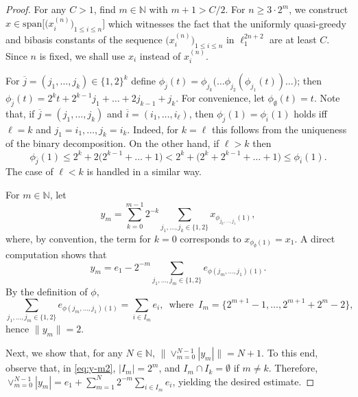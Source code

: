\documentclass[12pt,leqno]{amsart}
\numberwithin{equation}{section}
\theoremstyle{definition}
\def\N{{\mathbb N}}
\begin{document}
\begin{proof}
For any $C > 1$, find $m \in \N$ with $m+1 > C/2$.
 For $n \geq 3 \cdot 2^m$, we construct $x \in {\mathrm{span}} \big[ \big(x_i^{(n)}\big)_{1 \leq i \leq n} \big]$ which witnesses the fact that the uniformly quasi-greedy and  bibasis constants of the sequence $\big(x_i^{(n)}\big)_{1 \leq i \leq n}$ in $\ell_1^{2n+2}$ are at least $C$.
 Since $n$ is fixed, we shall use $x_i$ instead of $x_i^{(n)}$.
 \medskip

 
 For $\overline{j} = ( j_1, \ldots, j_k ) \in \{1,2\}^k$ define $\phi_{\overline{j}}(t) = \phi_{j_k} \big( \ldots \phi_{j_2}(\phi_{j_1}(t)) \ldots \big)$; then
 $\phi_{\overline{j}}(t) = 2^k t + 2^{k-1} j_1 + \ldots + 2 j_{k-1} + j_k$.
 For convenience, let $\phi_\emptyset(t) = t$.
 Note that, if $\overline{j} = ( j_1, \ldots, j_k )$ and $\overline{i} = ( i_1, \ldots, i_\ell )$, then $\phi_{\overline{j}}(1) = \phi_{\overline{i}}(1)$ holds iff $\ell = k$ and $j_1=i_1,\dots, j_k=i_k$. Indeed, for $k = \ell$ this follows from the uniqueness of the binary decomposition. On the other hand, if $\ell > k$ then
 $$
 \phi_{\overline{j}}(1) \leq 2^k + 2 \big( 2^{k-1} + \ldots + 1 \big) < 2^k + \big( 2^k + 2^{k-1} + \ldots + 1 \big) \leq \phi_{\overline{i}}(1) .
 $$
 The case of $\ell < k$ is handled in a similar way.
 \medskip
 
 For $m \in \N$, let
 $$
 y_m = \sum_{k=0}^{m-1} 2^{-k} \sum_{j_1, \ldots, j_k \in \{1,2\}} x_{\phi_{j_k, \ldots, j_1}(1)},
 $$
 where, by convention, the term for $k=0$ corresponds to $x_{\phi_\emptyset(1)} = x_1$.
 A direct computation shows that
 \begin{equation}
     \label{eq:y-m1}
 y_m = e_1 - 2^{-m} \sum_{j_1, \ldots, j_m \in \{1,2\}} e_{\phi(j_m, \ldots, j_1)(1)} .
 \end{equation}
 By the definition of $\phi$,
 \begin{equation}
     \label{eq:y-m2}
 \sum_{j_1, \ldots, j_m \in \{1,2\}} e_{\phi(j_m, \ldots, j_1)(1)} = %
 \sum_{i \in I_m} e_i, \, {\textrm{  where   }} \, I_m = \{2^{m+1}-1 , \ldots , 2^{m+1}+2^m-2 \} ,
 \end{equation}
 hence $\|y_m\| = 2$.
\medskip

 Next, we show that, for any $N \in \N$, $\| \vee_{m=0}^{N-1} |y_m| \| = N+1$. To this end, observe that, in \eqref{eq:y-m2}, $|I_m| = 2^m$, and $I_m \cap I_k = \emptyset$ if $m \neq k$. Therefore,
 $\vee_{m=0}^{N-1} |y_m| = e_1 + \sum_{m=1}^N 2^{-m} \sum_{i \in I_m} e_i$, yielding the desired estimate.
\medskip


\end{proof}
\end{document}
